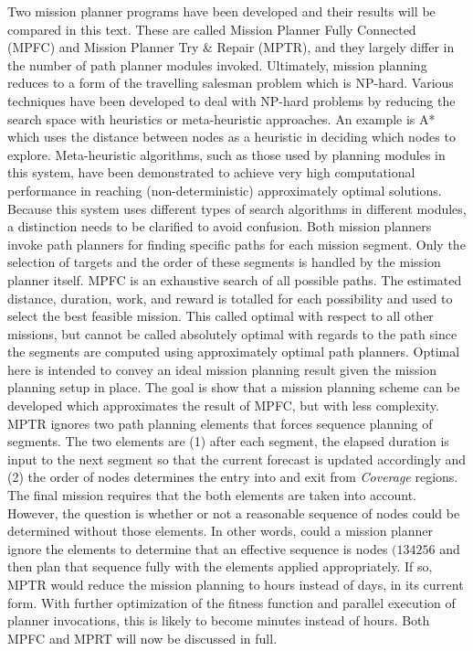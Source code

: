 \documentclass{tamuccthesis}
\begin{document}
Two mission planner programs have been developed and their results will be compared in this text. These are called Mission Planner Fully Connected (MPFC) and Mission Planner Try \& Repair (MPTR), and they largely differ in the number of path planner modules invoked. Ultimately, mission planning reduces to a form of the travelling salesman problem which is NP-hard. Various techniques have been developed to deal with NP-hard problems by reducing the search space with heuristics or meta-heuristic approaches. An example is A* which uses the distance between nodes as a heuristic in deciding which nodes to explore. Meta-heuristic algorithms, such as those used by planning modules in this system, have been demonstrated to achieve very high computational performance in reaching (non-deterministic) approximately optimal solutions. Because this system uses different types of search algorithms in different modules, a distinction needs to be clarified to avoid confusion. Both mission planners invoke path planners for finding specific paths for each mission segment. Only the selection of targets and the order of these segments is handled by the mission planner itself. MPFC is an exhaustive search of all possible paths. The estimated distance, duration, work, and reward is totalled for each possibility and used to select the best feasible mission. This called optimal with respect to all other missions, but cannot be called absolutely optimal with regards to the path since the segments are computed using approximately optimal path planners. Optimal here is intended to convey an ideal mission planning result given the mission planning setup in place. The goal is show that a mission planning scheme can be developed which approximates the result of MPFC, but with less complexity. MPTR ignores two path planning elements that forces sequence planning of segments. The two elements are (1) after each segment, the elapsed duration is input to the next segment so that the current forecast is updated accordingly and (2) the order of nodes determines the entry into and exit from \textit{Coverage} regions. The final mission requires that the both elements are taken into account. However, the question is whether or not a reasonable sequence of nodes could be determined without those elements. In other words, could a mission planner ignore the elements to determine that an effective sequence is nodes $(1 3 4 2 5 6$ and then plan that sequence fully with the elements applied appropriately. If so, MPTR would reduce the mission planning to hours instead of days, in its current form. With further optimization of the fitness function and parallel execution of planner invocations, this is likely to become minutes instead of hours. Both MPFC and MPRT will now be discussed in full.
\end{document}
